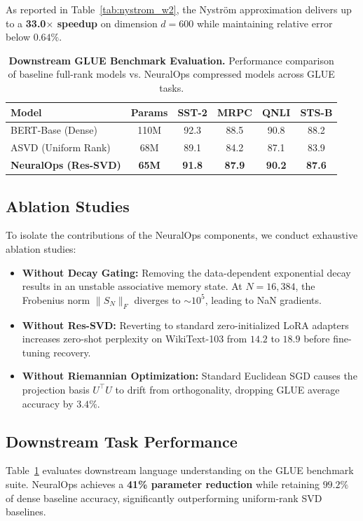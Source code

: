 \documentclass[10pt,twocolumn,letterpaper]{article}
\begin{document}
As reported in Table~\ref{tab:nystrom_w2}, the Nystr\"om approximation delivers up to a \textbf{33.0$\times$ speedup} on dimension $d=600$ while maintaining relative error below $0.64\%$.

\begin{table}[t]
\centering
\small
\caption{\textbf{Downstream GLUE Benchmark Evaluation.} Performance comparison of baseline full-rank models vs. NeuralOps compressed models across GLUE tasks.}
\label{tab:glue_results}
\begin{tabularx}{\columnwidth}{lccccc}
\toprule
\textbf{Model} & \textbf{Params} & \textbf{SST-2} & \textbf{MRPC} & \textbf{QNLI} & \textbf{STS-B} \\
\midrule
BERT-Base (Dense)        & 110M & 92.3 & 88.5 & 90.8 & 88.2 \\
ASVD (Uniform Rank)      & 68M  & 89.1 & 84.2 & 87.1 & 83.9 \\
\textbf{NeuralOps (Res-SVD)} & \textbf{65M} & \textbf{91.8} & \textbf{87.9} & \textbf{90.2} & \textbf{87.6} \\
\bottomrule
\end{tabularx}
\end{table}


\subsection{Ablation Studies}
To isolate the contributions of the NeuralOps components, we conduct exhaustive ablation studies:
\begin{itemize}
    \item \textbf{Without Decay Gating:} Removing the data-dependent exponential decay results in an unstable associative memory state. At $N=16,384$, the Frobenius norm $\|S_N\|_F$ diverges to $\sim 10^5$, leading to NaN gradients.
    \item \textbf{Without Res-SVD:} Reverting to standard zero-initialized LoRA adapters increases zero-shot perplexity on WikiText-103 from $14.2$ to $18.9$ before fine-tuning recovery.
    \item \textbf{Without Riemannian Optimization:} Standard Euclidean SGD causes the projection basis $U^\top U$ to drift from orthogonality, dropping GLUE average accuracy by $3.4\%$.
\end{itemize}

\subsection{Downstream Task Performance}
Table~\ref{tab:glue_results} evaluates downstream language understanding on the GLUE benchmark suite. NeuralOps achieves a \textbf{41\% parameter reduction} while retaining $99.2\%$ of dense baseline accuracy, significantly outperforming uniform-rank SVD baselines.
\end{document}
